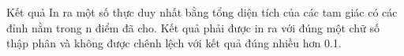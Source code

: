 Kết quả
In ra một số thực duy nhất bằng tổng diện tích của các tam giác có các đỉnh nằm trong n điểm đã cho. Kết quả phải được in ra với đúng một chữ số thập phân và không được chênh lệch với kết quả đúng nhiều hơn 0.1.